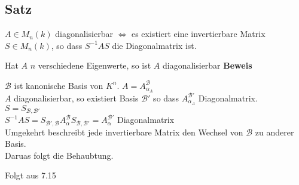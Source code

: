 \subsection{Satz}
		\item $A\in M_n(k)$ diagonalisierbar $\Leftrightarrow$ es existiert eine invertierbare Matrix $S\in M_n(k)$, so dass $S^{-1}AS$ die Diagonalmatrix ist.
		\item Hat $A$ $n$ verschiedene Eigenwerte, so ist $A$ diagonalisierbar
	\subExEnd
	\textbf{Beweis}
		\item $\mathcal{B}$ ist kanonische Basis von $K^n$. $A=A_{\alpha_A}^{\mathcal{B}}$\\
			$A$ diagonalisierbar, so existiert Basis $\mathcal{B}'$ so dass $A_{\alpha_A}^{\mathcal{B}'}$ Diagonalmatrix.\\
			$S=S_{\mathcal{B},\mathcal{B}'}$\\
			$S^{-1}AS=S_{\mathcal{B}',\mathcal{B}}A_\alpha^\mathcal{B}S_{\mathcal{B},\mathcal{B'}}=A_\alpha^{\mathcal{B}'}$ Diagonalmatrix\\
			Umgekehrt beschreibt jede invertierbare Matrix den Wechsel von $\mathcal{B}$ zu anderer Basis.\\
			Daruas folgt die Behaubtung.
		\item Folgt aus 7.15
	\subExEnd